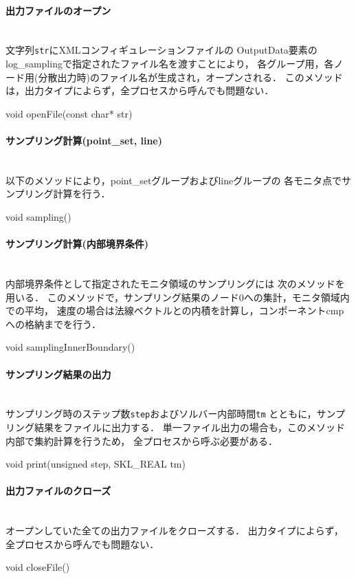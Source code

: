 %
\paragraph{出力ファイルのオープン}\mbox{}\\
文字列{\tt str}にXMLコンフィギュレーションファイルの
OutputData要素のlog\_samplingで指定されたファイル名を渡すことにより，
各グループ用，各ノード用(分散出力時)のファイル名が生成され，オープンされる．
このメソッドは，出力タイプによらず，全プロセスから呼んでも問題ない．
{\small
\begin{program}
void openFile(const char* str)
\end{program}
}

%
\paragraph{サンプリング計算(point\_set, line)}\mbox{}\\
以下のメソッドにより，point\_setグループおよびlineグループの
各モニタ点でサンプリング計算を行う．
{\small
\begin{program}
void sampling()
\end{program}
}

%
\paragraph{サンプリング計算(内部境界条件)}\mbox{}\\
内部境界条件として指定されたモニタ領域のサンプリングには
次のメソッドを用いる．
このメソッドで，サンプリング結果のノード0への集計，モニタ領域内での平均，
速度の場合は法線ベクトルとの内積を計算し，コンポーネントcmpへの格納までを行う．
{\small
\begin{program}
void samplingInnerBoundary()
\end{program}
}

%
\paragraph{サンプリング結果の出力}\mbox{}\\
サンプリング時のステップ数{\tt step}およびソルバー内部時間{\tt tm}
とともに，サンプリング結果をファイルに出力する．
単一ファイル出力の場合も，このメソッド内部で集約計算を行うため，
全プロセスから呼ぶ必要がある．
{\small
\begin{program}
void print(unsigned step, SKL_REAL tm)
\end{program}
}

%
\paragraph{出力ファイルのクローズ}\mbox{}\\
オープンしていた全ての出力ファイルをクローズする．
出力タイプによらず，全プロセスから呼んでも問題ない．
{\small
\begin{program}
void closeFile()
\end{program}
}

